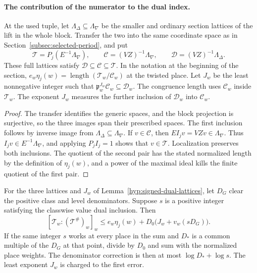 \paragraph{The contribution of the numerator to the dual index.}
\begin{established}\label{hyp:signed-dual-lattices}
At the used tuple, let \(\Lambda_\Delta\subseteq\Lambda_\nabla\)
be the smaller and ordinary section lattices of the lift in the
whole block. Transfer the two into the same coordinate space as in
Section~\ref{subsec:selected-period}, and put
\[
 \mathcal T=P_j(E^{-1}\Lambda_\nabla),\qquad
 \mathcal C=(VZ)^{-1}\Lambda_\nabla,\qquad
 \mathcal D=(VZ)^{-1}\Lambda_\Delta .
\]
These full lattices satisfy \(\mathcal D\subseteq\mathcal C\subseteq\mathcal T\). In the notation at the beginning of the section,
\(e_w\eta_j(w)=\operatorname{length}(\mathcal T_w/\mathcal C_w)\)
at the twisted place. Let \(J_w\) be the least nonnegative
integer such that \(\mathfrak p_w^{J_w}\mathcal C_w\subseteq
\mathcal D_w\). The congruence length uses \(\mathcal C_w\)
inside \(\mathcal T_w\). The exponent \(J_w\) measures
the further inclusion of \(\mathcal D_w\) into \(\mathcal C_w\).
\end{established}
\begin{proof}
The transfer identifies the generic spaces, and the block projection is surjective, so the three images span their prescribed spaces. The first inclusion follows by inverse image from \(\Lambda_\Delta\subseteq\Lambda_\nabla\). If \(v\in\mathcal C\), then \(EI_jv=VZv\in\Lambda_\nabla\). Thus \(I_jv\in E^{-1}\Lambda_\nabla\), and applying \(P_jI_j=1\) shows that \(v\in\mathcal T\). Localization preserves both inclusions. The quotient of the second pair has the stated normalized length by the definition of \(\eta_j(w)\), and a power of the maximal ideal kills the finite quotient of the first pair.
\end{proof}

\begin{proposition}
\label{prop:signed-lift-dual-index}
For the three lattices and \(J_w\) of
Lemma~\ref{hyp:signed-dual-lattices}, let \(D_G\) clear
the positive class and level denominators. Suppose \(s\) is a
positive integer satisfying the classwise value dual inclusion.
Then
\[
 [\mathcal T_w:(\mathcal T^\#)_w]_w
 \le e_w\eta_j(w)+D_0\bigl(J_w+v_w(sD_G)\bigr).
\]
If the same integer \(s\) works at every place in the sum and
\(D_*\) is a common multiple of the \(D_G\) at that point, divide
by \(D_0\) and sum with the normalized place weights. The
denominator correction is then at most \(\log D_*+\log s\).
The least exponent \(J_w\) is charged to the first error.
\end{proposition}

